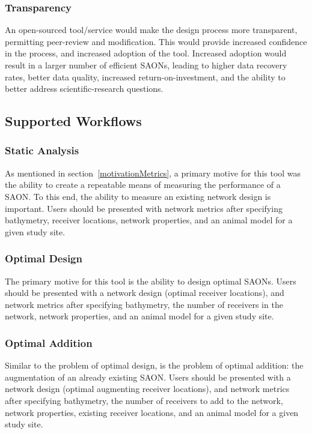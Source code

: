 \subsubsection{Transparency}
\label{motivationTransparency}
An open-sourced tool/service would make the design process more transparent, permitting peer-review and modification.  This would provide increased confidence in the process, and increased adoption of the tool.  Increased adoption would result in a larger number of efficient SAONs, leading to higher data recovery rates, better data quality, increased return-on-investment, and the ability to better address scientific-research questions.


\subsection{Supported Workflows}
\label{workflows}
\subsubsection{Static Analysis}
\label{staticAnalysis}
As mentioned in section~\ref{motivationMetrics}, a primary motive for this tool was the ability to create a repeatable means of measuring the performance of a SAON.  To this end, the ability to measure an existing network design is important.  Users should be presented with network metrics after specifying bathymetry, receiver locations, network properties, and an animal model for a given study site.


\subsubsection{Optimal Design}
\label{optimalDesign}
The primary motive for this tool is the ability to design optimal SAONs.  Users should be presented with a network design (optimal receiver locations), and network metrics after specifying bathymetry, the number of receivers in the network, network properties, and an animal model for a given study site.


\subsubsection{Optimal Addition}
\label{optimalAddition}
Similar to the problem of optimal design, is the problem of optimal addition: the augmentation of an already existing SAON.  Users should be presented with a network design (optimal augmenting receiver locations), and network metrics after specifying bathymetry, the number of receivers to add to the network, network properties, existing receiver locations, and an animal model for a given study site.

